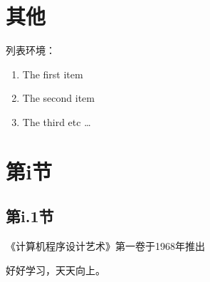 \newpage
\section{其他}
列表环境：
\renewcommand{\labelenumi}{(\roman{enumi})}
\begin{enumerate}
	\item The first item
	\item The second item
	\item The third etc \ldots
\end{enumerate}


\section{第i节}
\subsection{第i.1节}
\noindent %
《计算机程序设计艺术》第一卷于1968年推出\cite{huang}

\begin{exer}
	好好学习，天天向上。
\end{exer}
